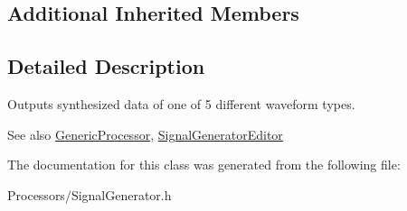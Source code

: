 \subsection*{Additional Inherited Members}


\subsection{Detailed Description}
Outputs synthesized data of one of 5 different waveform types.

\begin{DoxySeeAlso}{See also}
\hyperlink{classGenericProcessor}{Generic\-Processor}, \hyperlink{classSignalGeneratorEditor}{Signal\-Generator\-Editor} 
\end{DoxySeeAlso}


The documentation for this class was generated from the following file\-:\begin{DoxyCompactItemize}
\item 
Processors/Signal\-Generator.\-h\end{DoxyCompactItemize}
